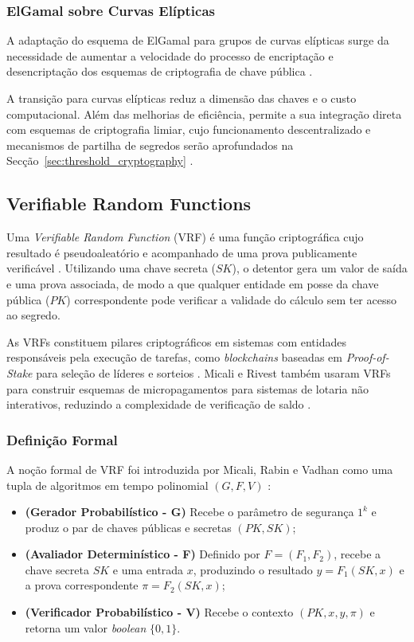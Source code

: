 \subsubsection{ElGamal sobre Curvas Elípticas}

A adaptação do esquema de ElGamal para grupos de curvas elípticas surge da necessidade de aumentar a velocidade do processo de encriptação e desencriptação dos esquemas de criptografia de chave pública \cite{ieee5620105_ecelgamal}.

A transição para curvas elípticas reduz a dimensão das chaves e o custo computacional. Além das melhorias de eficiência, permite a sua integração direta com esquemas de criptografia limiar, cujo funcionamento descentralizado e mecanismos de partilha de segredos serão aprofundados na Secção~\ref{sec:threshold_cryptography} \cite{ieee5620105_ecelgamal}.

\subsection{Verifiable Random Functions}

Uma \textit{Verifiable Random Function} (VRF) é uma função criptográfica cujo resultado é pseudoaleatório e acompanhado de uma prova publicamente verificável \cite{david2024musen}. Utilizando uma chave secreta ($SK$), o detentor gera um valor de saída e uma prova associada, de modo a que qualquer entidade em posse da chave pública ($PK$) correspondente pode verificar a validade do cálculo sem ter acesso ao segredo.

As VRFs constituem pilares criptográficos em sistemas com entidades responsáveis pela execução de tarefas, como \textit{blockchains} baseadas em \textit{Proof-of-Stake} para seleção de líderes e sorteios \cite{david2024musen}. Micali e Rivest também usaram VRFs para construir esquemas de micropagamentos para sistemas de lotaria não interativos, reduzindo a complexidade de verificação de saldo \cite{micali2002micropayments}.

\subsubsection{Definição Formal}

A noção formal de VRF foi introduzida por Micali, Rabin e Vadhan como uma tupla de algoritmos em tempo polinomial $(G, F, V)$ \cite{micali1999verifiable}:

\begin{itemize}
    \item \textbf{(Gerador Probabilístico - G)} Recebe o parâmetro de segurança $1^k$ e produz o par de chaves públicas e secretas $(PK, SK)$;
    \item \textbf{(Avaliador Determinístico - F)} Definido por $F = (F_1, F_2)$, recebe a chave secreta $SK$ e uma entrada $x$, produzindo o resultado $y = F_1(SK, x)$ e a prova correspondente $\pi = F_2(SK, x)$;
    \item \textbf{(Verificador Probabilístico - V)} Recebe o contexto $(PK, x, y, \pi)$ e retorna um valor \textit{boolean} $\{0, 1\}$.
\end{itemize}

